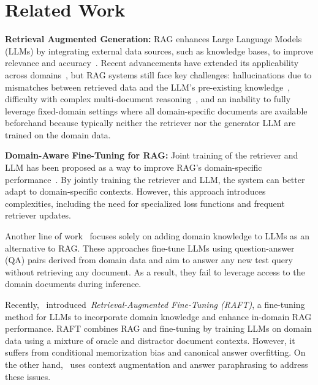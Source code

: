 \section{Related Work}\label{sec:related}

\noindent\textbf{Retrieval Augmented Generation:} RAG enhances Large Language Models (LLMs) by integrating external data sources, such as knowledge bases, to improve relevance and accuracy~\citep{lewis2020retrieval, guu2020retrieval, karpukhin2020dense}. Recent advancements have extended its applicability across domains~\citep{asai2024self, kimsure, yan2024corrective, liu-etal-2024-ra}, but RAG systems still face key challenges: hallucinations due to mismatches between retrieved data and the LLM’s pre-existing knowledge~\citep{setty2024improvingretrievalragbased, jin2024tug}, difficulty with complex multi-document reasoning~\citep{setty2024improvingretrievalragbased}, and an inability to fully leverage fixed-domain settings where all domain-specific documents are available beforehand because typically neither the retriever nor the generator LLM are trained on the domain data.

\noindent\textbf{Domain-Aware Fine-Tuning for RAG:} Joint training of the retriever and LLM has been proposed as a way to improve RAG’s domain-specific performance~\citep{guu2020retrieval, singh2021end, siriwardhana-etal-2023-improving, shi2024replug}. By jointly training the retriever and LLM, the system can better adapt to domain-specific contexts. However, this approach introduces complexities, including the need for specialized loss functions and frequent retriever updates. 

Another line of work~\citep{mecklenburg2024injecting, zhang2024self} focuses solely on adding domain knowledge to LLMs as an alternative to RAG.
These approaches fine-tune LLMs using question-answer (QA) pairs derived from domain data and aim to answer any new test query without retrieving any document. As a result, they fail to leverage access to the domain documents during inference.

Recently,~\citeauthor{zhang2024raft} introduced~\textit{Retrieval-Augmented Fine-Tuning (RAFT)}, a fine-tuning method for LLMs to incorporate domain knowledge and enhance in-domain RAG performance. 
RAFT combines RAG and fine-tuning by training LLMs on domain data using a mixture of oracle and distractor document contexts.
However, it suffers from conditional memorization bias and canonical answer overfitting. 
On the other hand, \ourmethodshort\ uses context augmentation and answer paraphrasing to address these issues.

